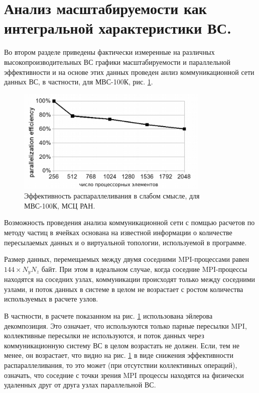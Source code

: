 		
		
		\section{Анализ масштабируемости как интегральной характеристики ВС.}
		
		Во втором разделе приведены фактически измеренные на различных высокопроизводительных ВС графики масштабируемости и параллельной эффективности и на основе этих данных проведен анлиз коммуникационной сети данных ВС, в частности, для МВС-100К, рис. \ref{eff2}. 
		
		\begin{figure}[h]
			\begin{center}
				\includegraphics[height=5cm,keepaspectratio]{images/eff_weak_JSCC.png}
				\caption{
					Эффективность распараллеливания в слабом смысле, для МВС-100К, МСЦ РАН.
				}
				\label{eff2}
			\end{center} 
		\end{figure}
		
		Возможность проведения анализа коммуникационной сети с помщью расчетов по методу частиц в ячейках основана на известной информации о количестве пересылаемых данных и о виртуальной топологии, используемой в программе.
		
		Размер данных, перемещаемых между двумя соседними MPI-процессами равен $144 \times N_y N_z  $ байт. При этом в идеальном случае, когда соседние MPI-процессы находятся на соседних узлах, коммуникации происходят только между соседними узлами, и поток данных в системе в целом не возрастает с ростом количества используемых в расчете узлов.
		
		В частности, в расчете показанном на рис. \ref{eff2} использована эйлерова декомпозиция. Это означает, что используются только парные пересылки MPI, коллективные пересылки не используются, и поток данных через коммуникационную систему ВС в целом возрастать не должен. Если, тем не менее, он возрастает, что видно на рис. \ref{eff2} в виде снижения эффективности распараллеливания, то это может (при отсутствии коллективных операций), означать, что соседние с точки зрения MPI процессы находятся на физически удаленных друг от друга узлах параллельной ВС.
		
